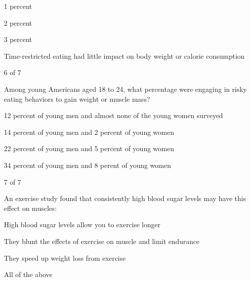 1 percent

2 percent

3 percent

Time-restricted eating had little impact on body weight or calorie
consumption

6 of 7

Among young Americans aged 18 to 24, what percentage were engaging in
risky eating behaviors to gain weight or muscle mass?

12 percent of young men and almost none of the young women surveyed

14 percent of young men and 2 percent of young women

22 percent of young men and 5 percent of young women

34 percent of young men and 8 perent of young women

7 of 7

An exercise study found that consistently high blood sugar levels may
have this effect on muscles:

High blood sugar levels allow you to exercise longer

They blunt the effects of exercise on muscle and limit endurance

They speed up weight loss from exercise

All of the above

\subsection{}

